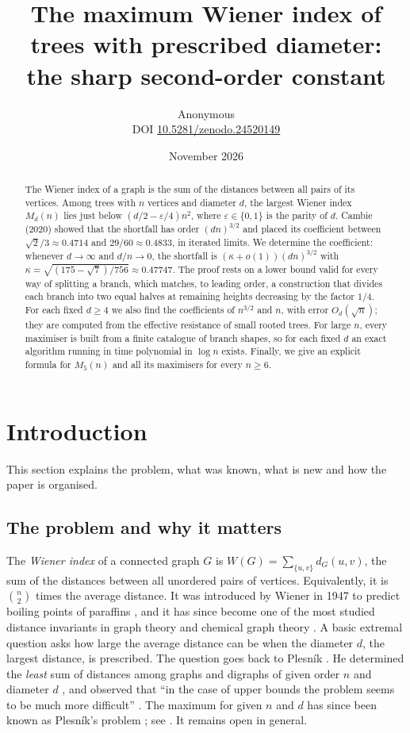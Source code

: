 \documentclass[11pt,a4paper]{article}
\title{The maximum Wiener index of trees with prescribed diameter:\\the sharp second-order constant}
\author{Anonymous\\[3pt]{\small DOI \href{https://doi.org/10.5281/zenodo.24520149}{10.5281/zenodo.24520149}}}
\date{November 2026}
\theoremstyle{remark}
\newcommand{\eps}{\varepsilon}
\begin{document}
\maketitle
\begin{abstract}
The Wiener index of a graph is the sum of the distances between all pairs of its vertices. Among trees with $n$ vertices and diameter $d$, the largest Wiener index $M_d(n)$ lies just below $(d/2-\eps/4)n^2$, where $\eps\in\{0,1\}$ is the parity of $d$. Cambie (2020) showed that the shortfall has order $(dn)^{3/2}$ and placed its coefficient between $\sqrt2/3\approx0.4714$ and $29/60\approx0.4833$, in iterated limits. We determine the coefficient: whenever $d\to\infty$ and $d/n\to0$, the shortfall is $(\kappa+o(1))(dn)^{3/2}$ with $\kappa=\sqrt{(175-\sqrt7)/756}\approx0.47747$. The proof rests on a lower bound valid for every way of splitting a branch, which matches, to leading order, a construction that divides each branch into two equal halves at remaining heights decreasing by the factor $1/4$. For each fixed $d\ge4$ we also find the coefficients of $n^{3/2}$ and $n$, with error $O_d(\sqrt n)$; they are computed from the effective resistance of small rooted trees. For large $n$, every maximiser is built from a finite catalogue of branch shapes, so for each fixed $d$ an exact algorithm running in time polynomial in $\log n$ exists. Finally, we give an explicit formula for $M_5(n)$ and all its maximisers for every $n\ge6$.
\end{abstract}

\section{Introduction}
This section explains the problem, what was known, what is new and how the paper is organised.

\subsection{The problem and why it matters}
The \emph{Wiener index} of a connected graph $G$ is $W(G)=\sum_{\{u,v\}}d_G(u,v)$, the sum of the distances between all unordered pairs of vertices. Equivalently, it is $\binom n2$ times the average distance. It was introduced by Wiener in 1947 to predict boiling points of paraffins \cite{wiener}, and it has since become one of the most studied distance invariants in graph theory and chemical graph theory \cite{kst}. A basic extremal question asks how large the average distance can be when the diameter $d$, the largest distance, is prescribed. The question goes back to Plesník \cite{plesnik}. He determined the \emph{least} sum of distances among graphs and digraphs of given order $n$ and diameter $d$ \cite[Thms~2--3]{plesnik}, and observed that ``in the case of upper bounds the problem seems to be much more difficult'' \cite[\S3]{plesnik}. The maximum for given $n$ and $d$ has since been known as Plesník's problem \cite{cambie}; see \cite[Problem~28]{kst}. It remains open in general.
\end{document}
